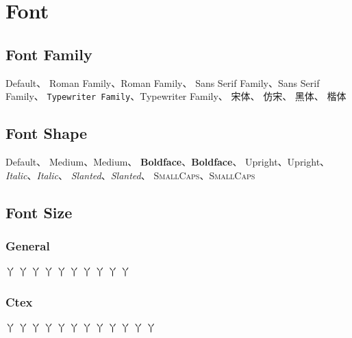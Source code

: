 \documentclass[UTF8]{ctexart}
\begin{document}
\section{Font}

\subsection{Font Family}
Default、
\textrm{Roman Family}、{\rmfamily Roman Family}、
\textsf{Sans Serif Family}、{\sffamily Sans Serif Family}、
\texttt{Typewriter Family}、{\ttfamily Typewriter Family}、
{\songti 宋体}、
{\fangsong 仿宋}、
{\heiti 黑体}、
{\kaishu 楷体}

\subsection{Font Shape}
Default、
\textmd{Medium}、{\mdseries Medium}、
\textbf{Boldface}、{\bfseries Boldface}、
\textup{Upright}、{\upshape Upright}、
\textit{Italic}、{\itshape Italic}、
\textsl{Slanted}、{\slshape Slanted}、
\textsc{SmallCaps}、{\scshape SmallCaps}

\subsection{Font Size}
\subsubsection{General}
{\tiny 丫}
{\scriptsize 丫}
{\footnotesize 丫}
{\small 丫}
{\normalsize 丫} %
{\large 丫}
{\Large 丫}
{\LARGE 丫}
{\huge 丫}
{\Huge 丫}
\subsubsection{Ctex}
{ 丫}
{ 丫}
{ 丫}
{ 丫}
{ 丫}
{ 丫}
{ 丫}
{ 丫}
{ 丫}
{ 丫}
{ 丫}
{ 丫}
\end{document}
